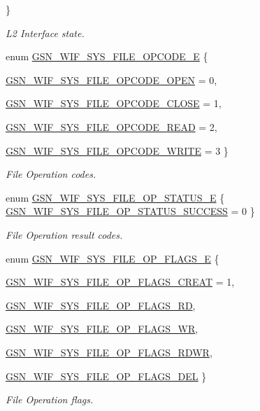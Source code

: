 \begin{DoxyCompactItemize}
 \}
\begin{DoxyCompactList}\small\item\em L2 Interface state. \end{DoxyCompactList}\item 
enum \hyperlink{a00639_ga24ebbde6925db9b03e4648c99be320b4}{GSN\_\-WIF\_\-SYS\_\-FILE\_\-OPCODE\_\-E} \{ \par
\hyperlink{a00639_gga24ebbde6925db9b03e4648c99be320b4a9297e545d68f2bbfb23886d76258954d}{GSN\_\-WIF\_\-SYS\_\-FILE\_\-OPCODE\_\-OPEN} =  0, 
\par
\hyperlink{a00639_gga24ebbde6925db9b03e4648c99be320b4a8fda2104e936080f682793861eed2af2}{GSN\_\-WIF\_\-SYS\_\-FILE\_\-OPCODE\_\-CLOSE} =  1, 
\par
\hyperlink{a00639_gga24ebbde6925db9b03e4648c99be320b4a80cebc45da04e421658eb57baa0b75df}{GSN\_\-WIF\_\-SYS\_\-FILE\_\-OPCODE\_\-READ} =  2, 
\par
\hyperlink{a00639_gga24ebbde6925db9b03e4648c99be320b4a000e53ca67ec09e29f77da0415fe675e}{GSN\_\-WIF\_\-SYS\_\-FILE\_\-OPCODE\_\-WRITE} =  3
 \}
\begin{DoxyCompactList}\small\item\em File Operation codes. \end{DoxyCompactList}\item 
enum \hyperlink{a00639_ga4ab9f7b6980d4b5c3f3a0199250b8923}{GSN\_\-WIF\_\-SYS\_\-FILE\_\-OP\_\-STATUS\_\-E} \{ \hyperlink{a00639_gga4ab9f7b6980d4b5c3f3a0199250b8923a8f28cfe76fca5043418aaa6eaeec9e0a}{GSN\_\-WIF\_\-SYS\_\-FILE\_\-OP\_\-STATUS\_\-SUCCESS} =  0
 \}
\begin{DoxyCompactList}\small\item\em File Operation result codes. \end{DoxyCompactList}\item 
enum \hyperlink{a00639_gac5b276b2a9ea66f27afb0f35e0e75257}{GSN\_\-WIF\_\-SYS\_\-FILE\_\-OP\_\-FLAGS\_\-E} \{ \par
\hyperlink{a00639_ggac5b276b2a9ea66f27afb0f35e0e75257a70c4828a84c7b58dbd61131c8bebfb1a}{GSN\_\-WIF\_\-SYS\_\-FILE\_\-OP\_\-FLAGS\_\-CREAT} =  1, 
\par
\hyperlink{a00639_ggac5b276b2a9ea66f27afb0f35e0e75257a3e3b02fa7233e93586c27fd95a8395aa}{GSN\_\-WIF\_\-SYS\_\-FILE\_\-OP\_\-FLAGS\_\-RD}, 
\par
\hyperlink{a00639_ggac5b276b2a9ea66f27afb0f35e0e75257a0afd71ef921c94f1b97cf8722f9235a4}{GSN\_\-WIF\_\-SYS\_\-FILE\_\-OP\_\-FLAGS\_\-WR}, 
\par
\hyperlink{a00639_ggac5b276b2a9ea66f27afb0f35e0e75257aea0bd02aef90199065c6bbe0d4c84c21}{GSN\_\-WIF\_\-SYS\_\-FILE\_\-OP\_\-FLAGS\_\-RDWR}, 
\par
\hyperlink{a00639_ggac5b276b2a9ea66f27afb0f35e0e75257acaacf27fc6f8dbce410f3651a6d9952c}{GSN\_\-WIF\_\-SYS\_\-FILE\_\-OP\_\-FLAGS\_\-DEL}
 \}
\begin{DoxyCompactList}\small\item\em File Operation flags. \end{DoxyCompactList}\end{DoxyCompactItemize}


